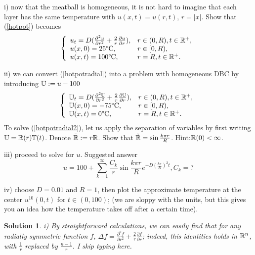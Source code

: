 \documentclass[6pt]{article}
\newtheorem{solution}{Solution}
\numberwithin{equation}{section}
\def\mathbb{\Bbb}
\begin{document}
\begin{enumerate}
i) now that the meatball is homogeneous, it is not hard to imagine that each layer has the same temperature with $u(x,t)=u(r,t)$, $r=|x|$.  Show that (\ref{hotpot}) becomes
\begin{equation}\label{hotpotradial}
\left\{
\begin{array}{ll}
u_t=D(\frac{\partial^2u}{\partial r^2}+\frac{2}{r}\frac{\partial u}{\partial r}),& r\in (0,R),t\in\mathbb R^+,\\
u(x,0)=25 \text{\textdegree{C}},&r\in [0,R),\\
u(x,t)=100 \text{\textdegree{C}}, &r=R, t\in\mathbb R^+.
\end{array}
\right.
\end{equation}

ii) we can convert (\ref{hotpotradial}) into a problem with homogeneous DBC by introducing $\mathbb U:=u-100$
\begin{equation}\label{hotpotradial2}
\left\{
\begin{array}{ll}
\mathbb U_t=D(\frac{\partial^2\mathbb U}{\partial r^2}+\frac{2}{r}\frac{\partial \mathbb U}{\partial r}),& r\in (0,R),t\in\mathbb R^+,\\
\mathbb U(x,0)=-75 \text{\textdegree{C}},&r\in [0,R),\\
\mathbb U(x,t)=0 \text{\textdegree{C}}, &r=R, t\in\mathbb R^+.
\end{array}
\right.
\end{equation}
To solve (\ref{hotpotradial2}), let us apply the separation of variables by first writing $\mathbb U=\mathbb R(r)\mathbb T(t)$.  Denote $\tilde {\mathbb R}:=r\mathbb R$.  Show that $\tilde {\mathbb R}=\sin\frac{k\pi r}{R}$.  Hint:$\mathbb R(0)<\infty$.

iii) proceed to solve for $u$.  Suggested answer
\[u=100+\sum_{k=1}^\infty \frac{C_k}{r}\sin\frac{k\pi r}{R}e^{-D(\frac{k\pi}{R})^2t}, C_k=?\]

iv) choose $D=0.01$ and $R=1$, then plot the approximate temperature at the center $u^{10}(0,t)$ for $t\in(0,100)$; (we are sloppy with the units, but this gives you an idea how the temperature takes off after a certain time).
\begin{solution}

i)  By straightforward calculations, we can easily find that for any radially symmetric function $f$, $\Delta f=\frac{\partial^2 f}{\partial r^2}+\frac{2}{r}\frac{\partial f}{\partial r}$; indeed, this identities holds in $\mathbb R^n$, with $\frac{1}{r}$ replaced by $\frac{n-1}{r}$.  I skip typing here.


\end{solution}
\end{enumerate}
\end{document}
